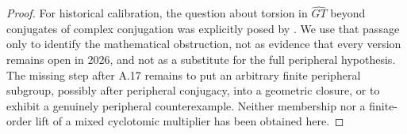 \begin{proof}
For historical calibration, the question about torsion
in $\widehat{GT}$ beyond conjugates of complex conjugation
was explicitly posed by
\citet[\S1.4(4), p.~190]{Schneps1997Survey}. We use that
passage only to identify the mathematical obstruction,
not as evidence that every version remains open in 2026,
and not as a substitute for the full peripheral hypothesis.
The missing step after A.17 remains to put an arbitrary
finite peripheral subgroup, possibly after peripheral
conjugacy, into a geometric closure, or to exhibit a
genuinely peripheral counterexample. Neither membership
nor a finite-order lift of a mixed cyclotomic multiplier
has been obtained here.
\end{proof}
